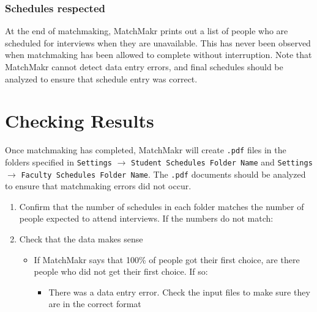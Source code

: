 \subsubsection{Schedules respected}
At the end of matchmaking, MatchMakr prints out a list of people who are scheduled for interviews when they are unavailable.  This has never been observed when matchmaking has been allowed to complete without interruption.  Note that MatchMakr cannot detect data entry errors, and final schedules should be analyzed to ensure that schedule entry was correct.


\section{Checking Results}

Once matchmaking has completed, MatchMakr will create \texttt{.pdf} files in the folders specified in \texttt{Settings} $\rightarrow$ \texttt{Student Schedules Folder Name} and \texttt{Settings} $\rightarrow$ \texttt{Faculty Schedules Folder Name}.  The \texttt{.pdf} documents should be analyzed to ensure that matchmaking errors did not occur.

\begin{enumerate}
	\item Confirm that the number of schedules in each folder matches the number of people expected to attend interviews.  If the numbers do not match:
	\item Check that the data makes sense
		\begin{itemize}
			\item If MatchMakr says that 100\% of people got their first choice, are there people who did not get their first choice.  If so:
				\begin{itemize}
					\item There was a data entry error.  Check the input files to make sure they are in the correct format
			\end{itemize}
		\end{itemize}
\end{enumerate}

